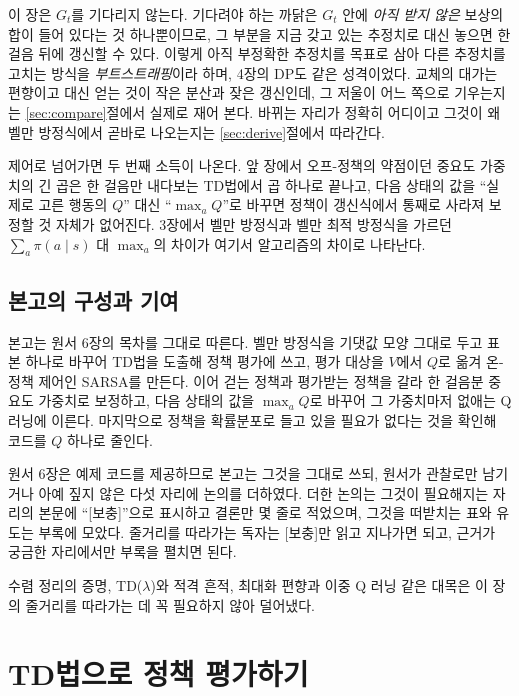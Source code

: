 \documentclass[11pt,a4paper]{article}
\begin{document}
이 장은 $G_t$를 기다리지 않는다. 기다려야 하는 까닭은 $G_t$ 안에 \emph{아직 받지 않은} 보상의 합이
들어 있다는 것 하나뿐이므로, 그 부분을 지금 갖고 있는 추정치로 대신 놓으면 한 걸음 뒤에 갱신할 수
있다. 이렇게 아직 부정확한 추정치를 목표로 삼아 다른 추정치를 고치는 방식을 \emph{부트스트래핑}이라
하며, 4장의 DP도 같은 성격이었다. 교체의 대가는 편향이고 대신 얻는 것이 작은 분산과 잦은 갱신인데,
그 저울이 어느 쪽으로 기우는지는 \ref{sec:compare}절에서 실제로 재어 본다. 바뀌는 자리가 정확히
어디이고 그것이 왜 벨만 방정식에서 곧바로 나오는지는 \ref{sec:derive}절에서 따라간다.

제어로 넘어가면 두 번째 소득이 나온다. 앞 장에서 오프-정책의 약점이던 중요도 가중치의 긴 곱은 한
걸음만 내다보는 TD법에서 곱 하나로 끝나고, 다음 상태의 값을 ``실제로 고른 행동의 $Q$'' 대신
``$\max_a Q$''로 바꾸면 정책이 갱신식에서 통째로 사라져 보정할 것 자체가 없어진다. 3장에서 벨만
방정식과 벨만 최적 방정식을 가르던 $\sum_a \pi(a\mid s)$ 대 $\max_a$의 차이가 여기서 알고리즘의
차이로 나타난다.

\subsection*{본고의 구성과 기여}

본고는 원서 6장의 목차를 그대로 따른다. 벨만 방정식을 기댓값 모양 그대로 두고 표본 하나로 바꾸어
TD법을 도출해 정책 평가에 쓰고, 평가 대상을 $V$에서 $Q$로 옮겨 온-정책 제어인 SARSA를 만든다. 이어
걷는 정책과 평가받는 정책을 갈라 한 걸음분 중요도 가중치로 보정하고, 다음 상태의 값을 $\max_a Q$로
바꾸어 그 가중치마저 없애는 Q 러닝에 이른다. 마지막으로 정책을 확률분포로 들고 있을 필요가 없다는
것을 확인해 코드를 $Q$ 하나로 줄인다.

원서 6장은 예제 코드를 제공하므로 본고는 그것을 그대로 쓰되, 원서가 관찰로만 남기거나 아예 짚지 않은
다섯 자리에 논의를 더하였다. 더한 논의는 그것이 필요해지는 자리의 본문에 ``[보충]''으로 표시하고
결론만 몇 줄로 적었으며, 그것을 떠받치는 표와 유도는 부록에 모았다. 줄거리를 따라가는 독자는 [보충]만
읽고 지나가면 되고, 근거가 궁금한 자리에서만 부록을 펼치면 된다.

수렴 정리의 증명, TD($\lambda$)와 적격 흔적, 최대화 편향과 이중 Q 러닝 같은 대목은 이 장의 줄거리를
따라가는 데 꼭 필요하지 않아 덜어냈다.

\section{TD법으로 정책 평가하기}
\label{sec:eval}
\end{document}
